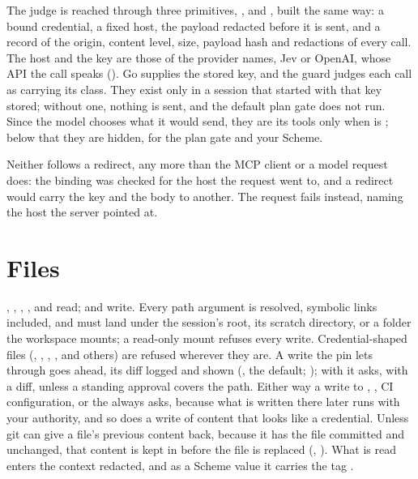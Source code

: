 The judge is reached through three primitives, ,
 and , built the same way: a bound
credential, a fixed host, the payload redacted before it is sent, and a
 record of the origin, content level, size, payload hash and
redactions of every call. The host and the key are those of the provider
\code{[judge]} names, Jev or OpenAI, whose API the call speaks ().
Go supplies the stored key, and the guard judges each call as carrying its
class. They exist only in a session that started with that key stored;
without one, nothing is sent, and the default plan gate does not run.
Since the model chooses what it would send, they are its tools only when
 is ; below that they are hidden, for the
plan gate and your Scheme.

Neither follows a redirect, any more than the MCP client or a model
request does: the binding was checked for the host the request went to, and
a redirect would carry the key and the body to another. The request fails
instead, naming the host the server pointed at.

\section{Files}

, , , ,
 and  read;  and
 write. Every path argument is resolved, symbolic links
included, and must land under the session's root, its scratch directory, or
a folder the workspace mounts; a read-only mount refuses every write.
Credential-shaped files (, , ,
,  and others) are refused wherever they are.
A write the pin lets through goes ahead, its diff logged and shown
(, the default; ); with
 it asks, with a diff, unless a standing approval covers the
path. Either way a write to , , CI
configuration,  or the  always asks, because
what is written there later runs with your authority, and so does a write
of content that looks like a credential. Unless git can give a file's
previous content back, because it has the file committed and unchanged,
that content is kept in  before the file is
replaced (, ). What is
read enters the context redacted, and as a Scheme value it carries the tag
.

